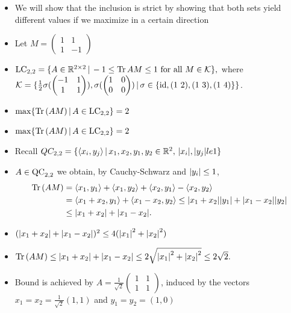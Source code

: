 \begin{frame}
	\begin{itemize}
		\item<1-> We will show that the inclusion is strict by showing that both sets yield different values if we maximize in a certain direction
		\item<2-> Let $M = \begin{pmatrix}
		1 & 1 \\ 1 & -1 
		\end{pmatrix} $
		\item <3-> {\footnotesize  $
			\textup{LC}_{2,2} = \{ A \in \mathbb{R}^{2 \times 2} \, | \, -1 \le  \text{Tr} \, {AM}  \le 1 \textup{ for all } M \in \mathcal{K} \},
			$
			where $ \mathcal{K}  = \{ \frac{1}{2}\sigma(\begin{pmatrix}
			-1 & 1 \\
			1 & 1
			\end{pmatrix}), \sigma(\begin{pmatrix}
			1 & 0 \\
			0 & 0
			\end{pmatrix}) \, | \,  \sigma \in \{ \textup{id}, (1 \, \, 2), (1 \, \, 3), (1 \, \, 4) \} \} $.}
		\item<3-> $ \max \{  \text{Tr} \, {(AM)} \, | \, A \in \textup{LC}_{2,2} \} = 2 $
			 
		
	\end{itemize}
\end{frame}

\begin{frame}
\begin{itemize}
	\item<1-> {\footnotesize $ \max \{  \text{Tr} \, {(AM)} \, | \, A \in \textup{LC}_{2,2} \} = 2 $ }
	\item<2-> Recall $ QC_{2,2} = \{ \langle x_i,y_j \rangle \, | \, x_1,x_2,y_1,y_2 \in \mathbb{R}^2, \, {\left|{x_i}\right|},{\left|{y_j}\right|} le 1 \} $
	\item <4->$ A \in \textup{QC}_{2,2} $ we obtain, by Cauchy-Schwarz and $ {\left|{y_i}\right|}\le 1 $,
	\begin{align*}
	\text{Tr} \, {(AM)} &= \langle x_1,y_1 \rangle + \langle x_1,y_2 \rangle + \langle x_2,y_1 \rangle - \langle x_2,y_2 \rangle   \\
	&= \langle x_1+x_2,y_1 \rangle + \langle x_1-x_2,y_2 \rangle  \le {\left|{x_1+x_2}\right|}{\left|{y_1}\right|} + {\left|{x_1-x_2}\right|}{\left|{y_2}\right|}  \\
	&\le {\left|{x_1+x_2}\right|} + {\left|{x_1-x_2}\right|}.
	\end{align*} 
	\item<5-> $({\left|{x_1+x_2}\right|} + {\left|{x_1-x_2}\right|})^2 \le  4({\left|{x_1}\right|}^2+{\left|{x_2}\right|}^2) $
	\item<6-> $\text{Tr} \, {(AM)}  \le {\left|{x_1+x_2}\right|} + {\left|{x_1-x_2}\right|} \le 2\sqrt{{\left|{x_1}\right|}^2+{\left|{x_2}\right|}^2} \le 2 \sqrt{2}. $
	\item<7-> Bound is achieved by  $ A = \frac{1}{\sqrt{2}}\begin{pmatrix}
	1 & 1 \\ 1 & 1 
	\end{pmatrix} $, induced by the vectors $ x_1 = x_2 = \frac{1}{\sqrt{2}}(1,1) $ and $ y_1 = y_2 =(1,0) $
\end{itemize}
\end{frame}



